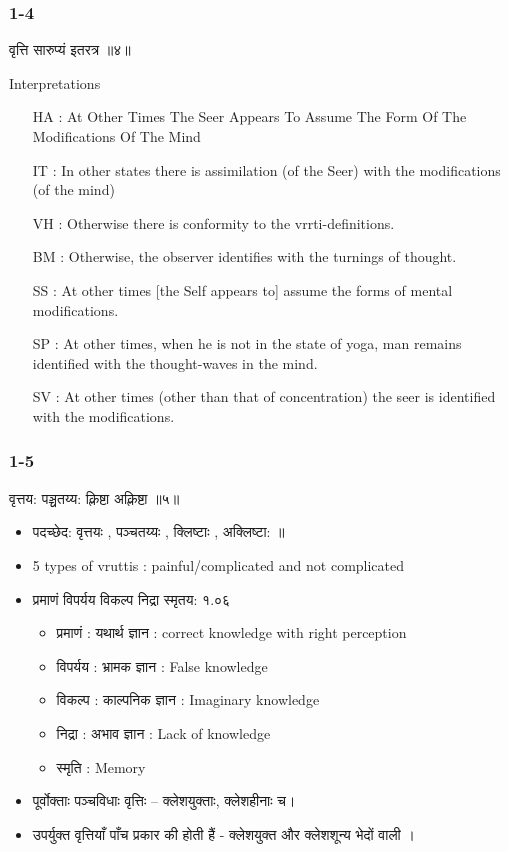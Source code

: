\begin{frame}[fragile]\frametitle{1-4}

\begin{sanskrit}
वृत्ति सारुप्यं इतरत्र ॥४॥
\end{sanskrit}

Interpretations
\begin{itemize}	
\item [HA]: At Other Times The Seer Appears To Assume The Form Of The Modifications Of The Mind
\item [IT]: In other states there is assimilation (of the Seer) with the modifications (of the mind)
\item [VH]: Otherwise there is conformity to the vrrti-definitions.
\item [BM]: Otherwise, the observer identifies with the turnings of thought.
\item [SS]: At other times [the Self appears to] assume the forms of mental modifications.
\item [SP]: At other times, when he is not in the state of yoga, man remains identified with the thought-waves in the mind.
\item [SV]: At other times (other than that of concentration) the seer is identified with the modifications.	
\end{itemize}

\end{frame}


\begin{frame}[fragile]\frametitle{1-5}

\begin{sanskrit}
वृत्तय: पञ्चतय्य: क्लिष्टा अक्लिष्टा ॥५॥
\end{sanskrit}


	\begin{itemize}
	\item पदच्छेद: वृत्तयः , पञ्चतय्यः , क्लिष्टाः , अक्लिष्टा: ॥
	\item 5 types of vruttis : painful/complicated and not complicated
	\item प्रमाणं विपर्यय विकल्प निद्रा स्मृतय: १.०६
		\begin{itemize}
		\item प्रमाणं : यथार्थ ज्ञान : correct knowledge with right perception
		\item विपर्यय : भ्रामक ज्ञान : False knowledge
		\item विकल्प : काल्पनिक ज्ञान : Imaginary knowledge
		\item निद्रा : अभाव ज्ञान : Lack of knowledge
		\item स्मृति : Memory
		\end{itemize}
	\item पूर्वोक्ताः पञ्चविधाः वृत्तिः – क्लेशयुक्ताः, क्लेशहीनाः च।
	\item उपर्युक्त वृत्तियाँ पाँच प्रकार की होती हैं - क्लेशयुक्त और क्लेशशून्य भेदों वाली ।		
	\end{itemize}

\end{frame}

